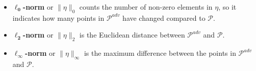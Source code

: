 \documentclass{ieeeaccess}
\begin{document}
\begin{itemize}
\item $\boldsymbol{\ell_0}$\textbf{-norm} or $ \|\eta\|_0 $ counts the number of non-zero elements in $\eta$, so it indicates how many points in $\mathcal{P}^{adv}$ have changed compared to $\mathcal{P}$.
\item $\boldsymbol{\ell_2}$\textbf{-norm} or $ \|\eta\|_2 $ is the Euclidean distance between $\mathcal{P}^{adv}$ and $\mathcal{P}$.
\item $\boldsymbol{\ell_\infty}$\textbf{-norm} or $ \|\eta\|_\infty $ is the maximum difference between the points in $\mathcal{P}^{adv}$ and $\mathcal{P}$.
\end{itemize}

\end{document}
